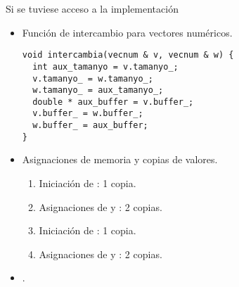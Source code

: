 \begin{frame}[t,fragile]{Si se tuviese acceso a la implementación}
\begin{itemize}
  \item Función de intercambio para vectores numéricos.
\begin{lstlisting}
void intercambia(vecnum & v, vecnum & w) {
  int aux_tamanyo = v.tamanyo_;
  v.tamanyo_ = w.tamanyo_;
  w.tamanyo_ = aux_tamanyo_;
  double * aux_buffer = v.buffer_;
  v.buffer_ = w.buffer_;
  w.buffer_ = aux_buffer;
}
\end{lstlisting}

  \item Asignaciones de memoria y copias de valores.
    \begin{enumerate}
      \item Iniciación de : 1 copia.
      \item Asignaciones de  y : 2 copias.
      \item Iniciación de : 1 copia.
      \item Asignaciones de  y : 2 copias.
    \end{enumerate}

  \item {} .
\end{itemize}
\end{frame}

